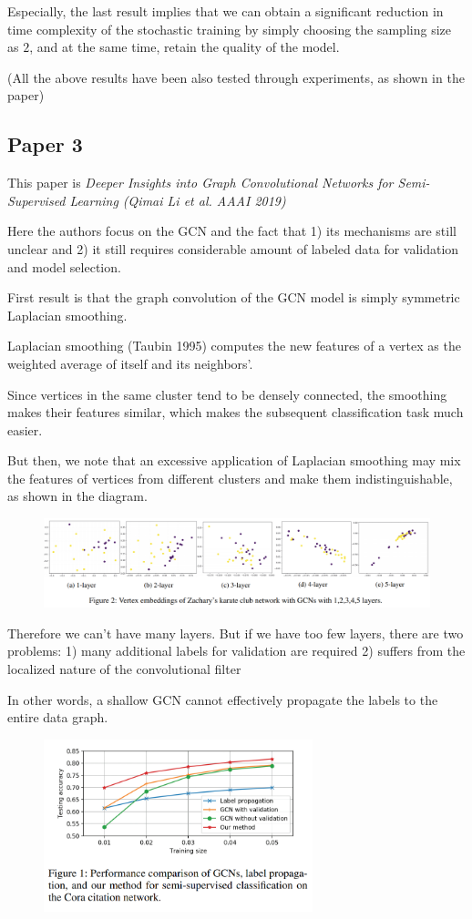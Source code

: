 \documentclass{article}
\begin{document}
Especially, the last result implies that we can obtain a significant reduction in time complexity of the stochastic training by simply choosing the sampling size as $2$, and at the same time, retain the quality of the model.

(All the above results have been also tested through experiments, as shown in the paper)


\subsection{Paper 3}
This paper is \textit{Deeper Insights into Graph Convolutional Networks for Semi-Supervised Learning (Qimai Li et al. AAAI 2019)}

Here the authors focus on the GCN and the fact that 1) its mechanisms are still unclear and 2) it still requires considerable amount of labeled data for validation and model selection.

First result is that the graph convolution of the GCN model is simply symmetric Laplacian smoothing.

Laplacian smoothing (Taubin 1995) computes the new features of a vertex as the weighted average of itself and its neighbors'.

Since vertices in the same cluster tend to be densely connected, the smoothing makes their features similar, which makes the subsequent classification task much easier.

But then, we note that an excessive application of Laplacian smoothing may mix the features of vertices from different clusters and make them indistinguishable, as shown in the diagram.

\begin{figure}[hbt]
  \includegraphics[width=\textwidth]{Figure3.png}
\end{figure}

Therefore we can't have many layers. But if we have too few layers, there are two problems:
1) many additional labels for validation are required
2) suffers from the localized nature of the convolutional filter

In other words, a shallow GCN cannot effectively propagate the labels to the entire data graph.
\begin{figure}[hbt]
   \includegraphics[height=5cm]{Figure4.png}
   \centering
\end{figure}
\end{document}
